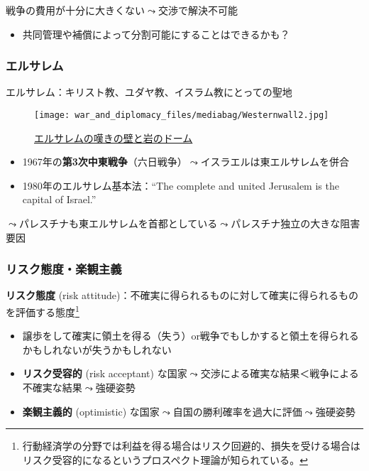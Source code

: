 \documentclass[
  xelatex,
  ja=standard]{bxjsarticle}
\providecommand{\tightlist}{%
  \setlength{\itemsep}{0pt}\setlength{\parskip}{0pt}}\usepackage{longtable,booktabs,array}
\begin{document}
戦争の費用が十分に大きくない\(\leadsto\)交渉で解決不可能

\begin{itemize}
\tightlist
\item
  共同管理や補償によって分割可能にすることはできるかも？
\end{itemize}

\hypertarget{ux30a8ux30ebux30b5ux30ecux30e0}{%
\subsubsection{エルサレム}\label{ux30a8ux30ebux30b5ux30ecux30e0}}

エルサレム：キリスト教、ユダヤ教、イスラム教にとっての聖地

\begin{figure}[htpb]

{\centering \texttt{[image: war\_and\_diplomacy\_files/mediabag/Westernwall2.jpg]}

}

\caption{\href{https://commons.wikimedia.org/wiki/File:Westernwall2.jpg}{エルサレムの嘆きの壁と岩のドーム}}

\end{figure}

\begin{itemize}
\tightlist
\item
  1967年の\textbf{第3次中東戦争}（六日戦争）\(\leadsto\)イスラエルは東エルサレムを併合
\item
  1980年のエルサレム基本法：``The complete and united Jerusalem is the
  capital of Israel.''
\end{itemize}

\(\leadsto\)パレスチナも東エルサレムを首都としている\(\leadsto\)パレスチナ独立の大きな阻害要因

\hypertarget{ux30eaux30b9ux30afux614bux5ea6ux697dux89b3ux4e3bux7fa9}{%
\subsubsection{リスク態度・楽観主義}\label{ux30eaux30b9ux30afux614bux5ea6ux697dux89b3ux4e3bux7fa9}}

\textbf{リスク態度} (risk
attitude)：不確実に得られるものに対して確実に得られるものを評価する態度\footnote{行動経済学の分野では利益を得る場合はリスク回避的、損失を受ける場合はリスク受容的になるというプロスペクト理論が知られている\citep{kahneman2013}。}

\begin{itemize}
\tightlist
\item
  譲歩をして確実に領土を得る（失う）or戦争でもしかすると領土を得られるかもしれないが失うかもしれない
\item
  \textbf{リスク受容的} (risk acceptant)
  な国家\(\leadsto\)交渉による確実な結果＜戦争による不確実な結果\(\leadsto\)強硬姿勢
\item
  \textbf{楽観主義的} (optimistic)
  な国家\(\leadsto\)自国の勝利確率を過大に評価\(\leadsto\)強硬姿勢
\end{itemize}
\end{document}
